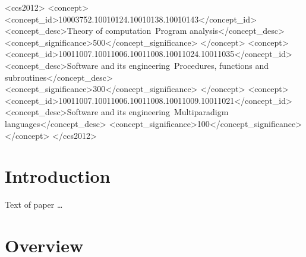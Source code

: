 \documentclass[sigplan,10pt]{acmart}\settopmatter{}
\begin{document}
\begin{CCSXML}
<ccs2012>
<concept>
<concept_id>10003752.10010124.10010138.10010143</concept_id>
<concept_desc>Theory of computation~Program analysis</concept_desc>
<concept_significance>500</concept_significance>
</concept>
<concept>
<concept_id>10011007.10011006.10011008.10011024.10011035</concept_id>
<concept_desc>Software and its engineering~Procedures, functions and subroutines</concept_desc>
<concept_significance>300</concept_significance>
</concept>
<concept>
<concept_id>10011007.10011006.10011008.10011009.10011021</concept_id>
<concept_desc>Software and its engineering~Multiparadigm languages</concept_desc>
<concept_significance>100</concept_significance>
</concept>
</ccs2012>
\end{CCSXML}


\maketitle

\section{Introduction}

Text of paper \ldots

\section{Overview}
\end{document}
